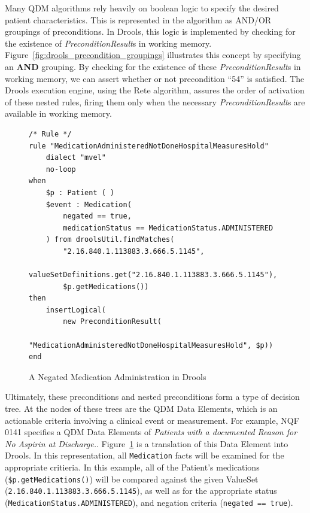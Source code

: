 \documentclass{amia}
\begin{document}
Many QDM algorithms rely heavily on boolean logic to specify the desired patient characteristics. This is represented in the algorithm as AND/OR groupings of preconditions. In Drools, this logic is implemented by checking for the existence of \textit{PreconditionResult}s in working memory. Figure~\ref{fig:drools_precondition_groupings} illustrates this concept by specifying an \textbf{AND} grouping. By checking for the existence of these \textit{PreconditionResult}s in working memory, we can assert whether or not precondition ``54'' is satisfied. The Drools execution engine, using the Rete algorithm, assures the order of activation of these nested rules, firing them only when the necessary \textit{PreconditionResult}s are available in working memory\cite{forgy1982rete}.


\begin{figure}[H]
\begin{verbatim}
/* Rule */
rule "MedicationAdministeredNotDoneHospitalMeasuresHold"
    dialect "mvel"
    no-loop
when
    $p : Patient ( )
    $event : Medication(
        negated == true,
        medicationStatus == MedicationStatus.ADMINISTERED
    ) from droolsUtil.findMatches(
        "2.16.840.1.113883.3.666.5.1145", 
        valueSetDefinitions.get("2.16.840.1.113883.3.666.5.1145"), 
        $p.getMedications())
then
    insertLogical(
        new PreconditionResult(
            "MedicationAdministeredNotDoneHospitalMeasuresHold", $p))
end
\end{verbatim}
\caption{A Negated Medication Administration in Drools} 
\label{fig:drools_data_element}
\end{figure}

Ultimately, these preconditions and nested preconditions form a type of decision tree. At the nodes of these trees are the QDM Data Elements\cite{http://www.healthit.gov/sites/default/files/qdm_122012.pdf}, which is an actionable criteria involving a clinical event or measurement. For example, NQF 0141 specifies a QDM Data Elements of \textit{Patients with a documented Reason for No Aspirin at Discharge.}. Figure~\ref{fig:drools_data_element} is a translation of this Data Element into Drools. In this representation, all \texttt{Medication} facts will be examined for the appropriate critieria. In this example, all of the Patient's medications (\texttt{\$p.getMedications()}) will be compared against the given ValueSet (\texttt{2.16.840.1.113883.3.666.5.1145}), as well as for the appropriate status (\texttt{MedicationStatus.ADMINISTERED}), and negation criteria (\texttt{negated == true}).
\end{document}
